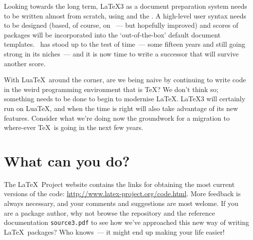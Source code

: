 \documentclass{ltnews}
\begin{document}
Looking towards the long term, \LaTeX3 as a document preparation system needs
to be written almost from scratch, using  and the
. A high-level user syntax needs to be designed (based, of
course, on \LaTeXe~--- but hopefully improved) and scores of packages will be
incorporated into the `out-of-the-box' default document templates. \LaTeXe\
has stood up to the test of time~--- some fifteen years and still going strong
in its niches~--- and it is now time to write a successor that will survive
another score.

With Lua\TeX\ around the corner, are we being naive by continuing to write
code in the weird programming environment that is \TeX? We don't think so;
something needs to be done to begin to modernise \LaTeX. \LaTeX3 will
certainly run on Lua\TeX, and when the time is right will also take advantage
of its new features. Consider what we're doing now the groundwork for a
migration to where-ever \TeX\ is going in the next few years.

\section{What can you do?}

The \LaTeX~Project website contains the links for obtaining the most current
versions of the code: \url{http://www.latex-project.org/code.html}. More
feedback is always necessary, and your comments and suggestions are most
welome. If you are a package author, why not browse the repository and the
reference documentation \texttt{source3.pdf} to see how we've approached this
new way of writing \LaTeX\ packages? Who knows~--- it might end up making your
life easier!
\end{document}
